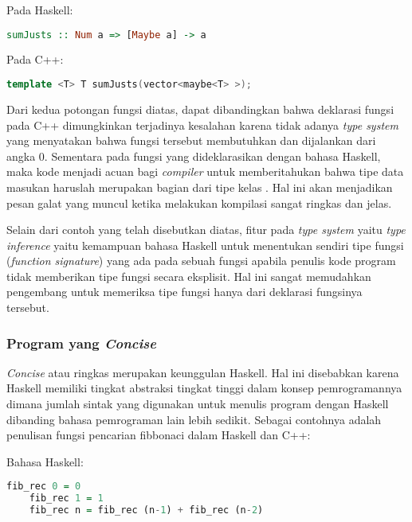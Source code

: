 \documentclass[pi.tex]{subfile}
\begin{document}
  Pada Haskell:\\
  \begin{lstlisting}[language=Haskell]
    sumJusts :: Num a => [Maybe a] -> a
  \end{lstlisting}

  Pada C++:\\
  \begin{lstlisting}[language=C++]
    template <T> T sumJusts(vector<maybe<T> >);
  \end{lstlisting}

  \hspace{8pt}Dari kedua potongan fungsi diatas, dapat dibandingkan bahwa deklarasi fungsi pada C++ dimungkinkan terjadinya kesalahan karena tidak adanya \emph{type system} yang menyatakan bahwa fungsi tersebut membutuhkan \fhaskell{(+)} dan dijalankan dari angka 0. Sementara pada fungsi yang dideklarasikan dengan bahasa Haskell, maka kode  menjadi acuan bagi \emph{compiler} untuk memberitahukan bahwa tipe data masukan haruslah merupakan bagian dari tipe kelas . Hal ini akan menjadikan pesan galat yang muncul ketika melakukan kompilasi sangat ringkas dan jelas.

  \hspace{8pt}Selain dari contoh yang telah disebutkan diatas, fitur pada \emph{type system} yaitu \emph{type inference} yaitu kemampuan bahasa Haskell untuk menentukan sendiri tipe fungsi (\emph{function signature}) yang ada pada sebuah fungsi apabila penulis kode program tidak memberikan tipe fungsi secara eksplisit. Hal ini sangat memudahkan pengembang untuk memeriksa tipe fungsi hanya dari deklarasi fungsinya tersebut.

 \subsubsection{Program yang \emph{Concise}}\hspace{10pt}
  \emph{Concise} atau ringkas merupakan keunggulan Haskell. Hal ini disebabkan karena Haskell memiliki tingkat abstraksi tingkat tinggi dalam konsep pemrogramannya dimana jumlah sintak yang digunakan untuk menulis program dengan Haskell dibanding bahasa pemrograman lain lebih sedikit. Sebagai contohnya adalah penulisan fungsi pencarian fibbonaci dalam Haskell dan C++:

  \hspace{10pt}Bahasa Haskell: \\
  \begin{lstlisting}[language=Haskell]
    fib_rec 0 = 0
    fib_rec 1 = 1
    fib_rec n = fib_rec (n-1) + fib_rec (n-2)  
  \end{lstlisting}
\end{document}
